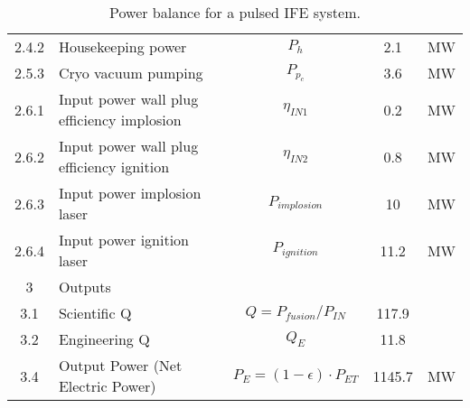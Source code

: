 \begin{table}[ht!]
\begin{tabular}{|c|p{5cm}|c|c|c|}
2.4.2	&	Housekeeping power	&	$P_{{h}}$	&	2.1	&	MW \\
2.5.3	&	Cryo vacuum pumping	&	$P_{{p}_c}$	&	3.6	&	MW \\
2.6.1	& Input power wall plug efficiency implosion &	$\eta_{IN1}$ & 0.2	&	MW \\
2.6.2	& Input power wall plug efficiency ignition &	$\eta_{IN2}$& 0.8	&	MW \\
2.6.3	& Input power implosion laser	& $P_{implosion}$	&	10	&	MW \\
2.6.4	& Input power ignition laser	& $P_{ignition}$	&	11.2	&	MW \\
\hline								
3	&	Outputs	&		&		&	\\
\hline
3.1	&	Scientific Q	&	$Q = P_{{fusion}}/P_{{IN}}$	&	117.9	&	\\
3.2	&	Engineering Q	&	$Q_{{E}}$	&	11.8	&	\\
3.4	&	Output Power (Net Electric Power)	&	$P_{{E}} = (1 - \epsilon) \cdot P_{{ET}}$	&	1145.7	&	MW \\
\hline								
\end{tabular}	
\caption{Power balance for a pulsed IFE system.}
\label{tab:powerbalance}
\end{table}





